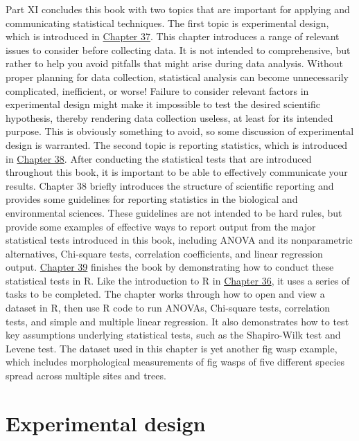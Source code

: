\documentclass[
]{scrbook}
\begin{document}
Part XI concludes this book with two topics that are important for applying and communicating statistical techniques.
The first topic is experimental design, which is introduced in \protect\hyperlink{Chapter_37}{Chapter 37}.
This chapter introduces a range of relevant issues to consider before collecting data.
It is not intended to comprehensive, but rather to help you avoid pitfalls that might arise during data analysis.
Without proper planning for data collection, statistical analysis can become unnecessarily complicated, inefficient, or worse!
Failure to consider relevant factors in experimental design might make it impossible to test the desired scientific hypothesis, thereby rendering data collection useless, at least for its intended purpose.
This is obviously something to avoid, so some discussion of experimental design is warranted.
The second topic is reporting statistics, which is introduced in \protect\hyperlink{Chapter_38}{Chapter 38}.
After conducting the statistical tests that are introduced throughout this book, it is important to be able to effectively communicate your results.
Chapter 38 briefly introduces the structure of scientific reporting and provides some guidelines for reporting statistics in the biological and environmental sciences.
These guidelines are not intended to be hard rules, but provide some examples of effective ways to report output from the major statistical tests introduced in this book, including ANOVA and its nonparametric alternatives, Chi-square tests, correlation coefficients, and linear regression output.
\protect\hyperlink{Chapter_39}{Chapter 39} finishes the book by demonstrating how to conduct these statistical tests in R.
Like the introduction to R in \protect\hyperlink{Chapter_36}{Chapter 36}, it uses a series of tasks to be completed.
The chapter works through how to open and view a dataset in R, then use R code to run ANOVAs, Chi-square tests, correlation tests, and simple and multiple linear regression.
It also demonstrates how to test key assumptions underlying statistical tests, such as the Shapiro-Wilk test and Levene test.
The dataset used in this chapter is yet another fig wasp example, which includes morphological measurements of fig wasps of five different species spread across multiple sites and trees.

\hypertarget{Chapter_37}{%
\chapter{Experimental design}\label{Chapter_37}}
\end{document}
